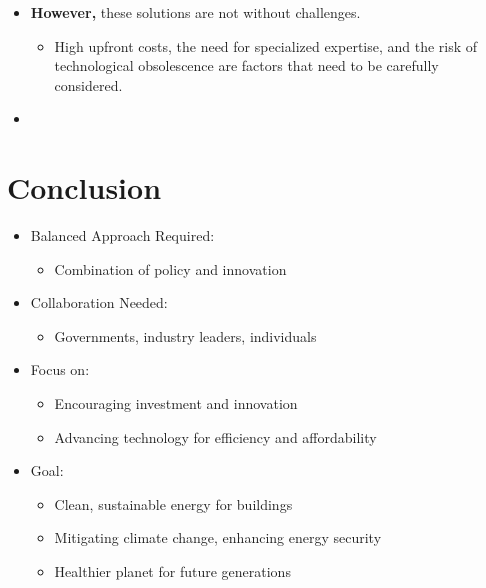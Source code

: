 \documentclass[
  letterpaper,
  DIV=11,
  numbers=noendperiod]{scrartcl}
\providecommand{\tightlist}{%
  \setlength{\itemsep}{0pt}\setlength{\parskip}{0pt}}\usepackage{longtable,booktabs,array}
\begin{document}
\begin{itemize}
\tightlist
\item
  \textbf{However,} these solutions are not without challenges.

  \begin{itemize}
  \tightlist
  \item
    High upfront costs, the need for specialized expertise, and the risk
    of technological obsolescence are factors that need to be carefully
    considered.
  \end{itemize}
\end{itemize}

\begin{itemize}
\tightlist
\item
\end{itemize}

\section{Conclusion}\label{conclusion}

\begin{itemize}
\tightlist
\item
  Balanced Approach Required:

  \begin{itemize}
  \tightlist
  \item
    Combination of policy and innovation
  \end{itemize}
\item
  Collaboration Needed:

  \begin{itemize}
  \tightlist
  \item
    Governments, industry leaders, individuals
  \end{itemize}
\item
  Focus on:

  \begin{itemize}
  \tightlist
  \item
    Encouraging investment and innovation
  \item
    Advancing technology for efficiency and affordability
  \end{itemize}
\item
  Goal:

  \begin{itemize}
  \tightlist
  \item
    Clean, sustainable energy for buildings
  \item
    Mitigating climate change, enhancing energy security
  \item
    Healthier planet for future generations
  \end{itemize}
\end{itemize}
\end{document}
